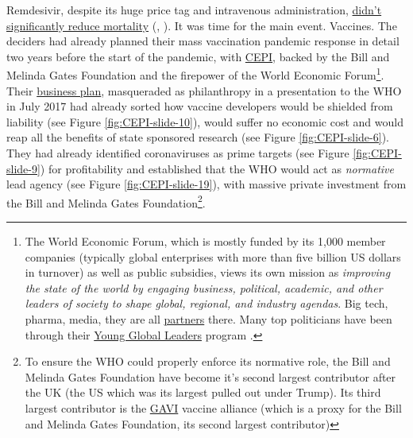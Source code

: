 \documentclass[11pt,a4paper,notitlepage]{report}
\begin{document}
Remdesivir, despite its huge price tag and intravenous administration, \href{https://www.thelancet.com/journals/laninf/article/ PIIS1473-3099(21)00485-0/fulltext}{didn’t significantly reduce mortality} (\cite{Ader21}, \cite{Yan2021-pc}). It was time for the main event. Vaccines. The deciders had already planned their mass vaccination pandemic response in detail two years before the start of the pandemic, with \href{https://cepi.net/news_cepi/global-partnership-launched-to-prevent-epidemics-with-new-vaccines/}{CEPI}, backed by the Bill and Melinda Gates Foundation and the firepower of the World Economic Forum\footnote{The World Economic Forum, which is mostly funded by its 1,000 member companies (typically global enterprises with more than five billion US dollars in turnover) as well as public subsidies, views its own mission as \textit{improving the state of the world by engaging business, political, academic, and other leaders of society to shape global, regional, and industry agendas}. Big tech, pharma, media, they are all \href{https://www.weforum.org/partners}{partners} there. Many top politicians have been through their \href{https://www.informedchoiceaustralia.com/post/wef-and-their-young-global-leaders-program}{Young Global Leaders} program \cite{ica09122021}.}. Their \href{https://www.who.int/medicines/ebola-treatment/TheCoalitionEpidemicPreparednessInnovations-an-overview.pdf}{business plan}, masqueraded as philanthropy in a presentation to the WHO in July 2017 \cite{cepi072017} had already sorted how vaccine developers would be shielded from liability (see Figure \ref{fig:CEPI-slide-10}), would suffer no economic cost and would reap all the benefits of state sponsored research (see Figure \ref{fig:CEPI-slide-6}). They had already identified coronaviruses as prime targets (see Figure \ref{fig:CEPI-slide-9}) for profitability and established that the WHO would act as \textit{normative} lead agency (see Figure \ref{fig:CEPI-slide-19}), with massive private investment from the Bill and Melinda Gates Foundation\footnote{To ensure the WHO could properly enforce its normative role, the Bill and Melinda Gates Foundation have become it's second largest contributor after the UK (the US which was its largest pulled out under Trump). Its third largest contributor is the \href{https://en.wikipedia.org/wiki/GAVI}{GAVI} vaccine alliance (which is a proxy for the Bill and Melinda Gates Foundation, its second largest contributor)}.
\end{document}
